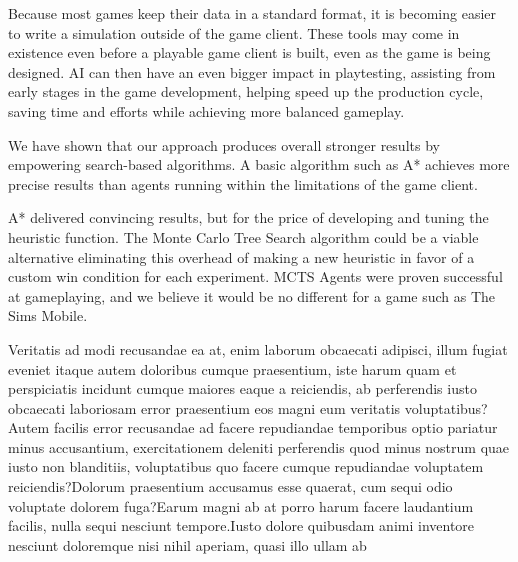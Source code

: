 \documentclass[letterpaper]{article} %
\begin{document}
Because most games keep their data in a standard format, it is becoming easier to write a simulation outside of the game client. These tools may come in existence even before a playable game client is built, even as the game is being designed. AI can then have an even bigger impact in playtesting, assisting from early stages in the game development, helping speed up the production cycle, saving time and efforts while achieving more balanced gameplay.
%
%

We have shown that our approach produces overall stronger results by empowering search-based algorithms. A basic algorithm such as A* achieves more precise results than agents running within the limitations of the game client.

A* delivered convincing results, but for the price of developing and tuning the heuristic function. The Monte Carlo Tree Search algorithm could be a viable alternative eliminating this overhead of making a new heuristic in favor of a custom win condition for each experiment. MCTS Agents were proven successful at gameplaying, and we believe it would be no different for a game such as The Sims Mobile.

Veritatis ad modi recusandae ea at, enim laborum obcaecati adipisci, illum fugiat eveniet itaque autem doloribus cumque praesentium, iste harum quam et perspiciatis incidunt cumque maiores eaque a reiciendis, ab perferendis iusto obcaecati laboriosam error praesentium eos magni eum veritatis voluptatibus?Autem facilis error recusandae ad facere repudiandae temporibus optio pariatur minus accusantium, exercitationem deleniti perferendis quod minus nostrum quae iusto non blanditiis, voluptatibus quo facere cumque repudiandae voluptatem reiciendis?Dolorum praesentium accusamus esse quaerat, cum sequi odio voluptate dolorem fuga?Earum magni ab at porro harum facere laudantium facilis, nulla sequi nesciunt tempore.Iusto dolore quibusdam animi inventore nesciunt doloremque nisi nihil aperiam, quasi illo ullam ab


\end{document}

